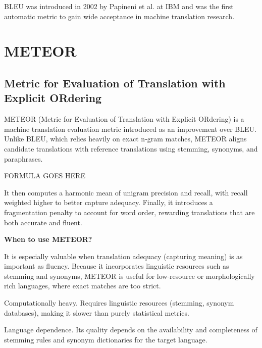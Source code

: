 \clearpage

\thispagestyle{customstyle}

{BLEU was introduced in 2002 by Papineni et al. at IBM and was the first automatic metric to gain
wide acceptance in machine translation research.}



\clearpage
\thispagestyle{nlpstyle}
\section{METEOR}
\subsection{Metric for Evaluation of Translation with Explicit ORdering}

METEOR (Metric for Evaluation of Translation with Explicit ORdering) is a machine translation
evaluation metric introduced as an improvement over BLEU. Unlike BLEU, which relies heavily on
exact n-gram matches, METEOR aligns candidate translations with reference translations using stemming,
synonyms, and paraphrases. 

\begin{center}
    FORMULA GOES HERE
\end{center}

It then computes a harmonic mean of unigram precision and recall, with
recall weighted higher to better capture adequacy. Finally, it introduces a fragmentation penalty to
account for word order, rewarding translations that are both accurate and fluent.

\textbf{When to use METEOR?}

It is especially valuable when translation adequacy (capturing meaning) is as important as fluency.
Because it incorporates linguistic resources such as stemming and synonyms, METEOR is useful for
low-resource or morphologically rich languages, where exact matches are too strict.

{
\item Computationally heavy. Requires linguistic resources (stemming, synonym databases),
making it slower than purely statistical metrics.
\item Language dependence. Its quality depends on the availability and completeness of stemming
rules and synonym dictionaries for the target language.
}

